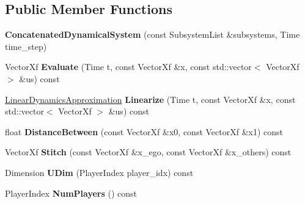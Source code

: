 \subsection*{Public Member Functions}
\begin{DoxyCompactItemize}
\item 
{\bfseries Concatenated\+Dynamical\+System} (const Subsystem\+List \&subsystems, Time time\+\_\+step)\hypertarget{classilqgames_1_1_concatenated_dynamical_system_afbac1f5e7a0ceaa9b59a0354e959266f}{}\label{classilqgames_1_1_concatenated_dynamical_system_afbac1f5e7a0ceaa9b59a0354e959266f}

\item 
Vector\+Xf {\bfseries Evaluate} (Time t, const Vector\+Xf \&x, const std\+::vector$<$ Vector\+Xf $>$ \&us) const \hypertarget{classilqgames_1_1_concatenated_dynamical_system_aba82e3499a437d6c27c8575f0e749298}{}\label{classilqgames_1_1_concatenated_dynamical_system_aba82e3499a437d6c27c8575f0e749298}

\item 
\hyperlink{structilqgames_1_1_linear_dynamics_approximation}{Linear\+Dynamics\+Approximation} {\bfseries Linearize} (Time t, const Vector\+Xf \&x, const std\+::vector$<$ Vector\+Xf $>$ \&us) const \hypertarget{classilqgames_1_1_concatenated_dynamical_system_a9939297ff3859abc1cf0ad6207783167}{}\label{classilqgames_1_1_concatenated_dynamical_system_a9939297ff3859abc1cf0ad6207783167}

\item 
float {\bfseries Distance\+Between} (const Vector\+Xf \&x0, const Vector\+Xf \&x1) const \hypertarget{classilqgames_1_1_concatenated_dynamical_system_a5d241472286d6f3e49b38c02e47d25f1}{}\label{classilqgames_1_1_concatenated_dynamical_system_a5d241472286d6f3e49b38c02e47d25f1}

\item 
Vector\+Xf {\bfseries Stitch} (const Vector\+Xf \&x\+\_\+ego, const Vector\+Xf \&x\+\_\+others) const \hypertarget{classilqgames_1_1_concatenated_dynamical_system_a81183125fda71b1d57a1630d27f21d98}{}\label{classilqgames_1_1_concatenated_dynamical_system_a81183125fda71b1d57a1630d27f21d98}

\item 
Dimension {\bfseries U\+Dim} (Player\+Index player\+\_\+idx) const \hypertarget{classilqgames_1_1_concatenated_dynamical_system_a99e27c1644875b924741e037bcb54460}{}\label{classilqgames_1_1_concatenated_dynamical_system_a99e27c1644875b924741e037bcb54460}

\item 
Player\+Index {\bfseries Num\+Players} () const \hypertarget{classilqgames_1_1_concatenated_dynamical_system_a81821c7e9776a45b319f7153bcd93248}{}\label{classilqgames_1_1_concatenated_dynamical_system_a81821c7e9776a45b319f7153bcd93248}

\end{DoxyCompactItemize}
